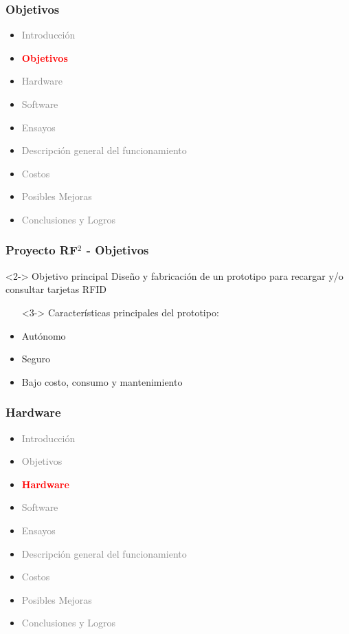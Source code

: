 \documentclass{beamer}
\begin{document}
\begin{frame}
	\frametitle{Objetivos}
	\begin{itemize}
		\item \textcolor{gray}{Introducción}
		\item \textcolor{red}{\bf{Objetivos}}
		\item \textcolor{gray}{Hardware}
		\item \textcolor{gray}{Software}
		\item \textcolor{gray}{Ensayos}
		\item \textcolor{gray}{Descripción general del funcionamiento}		
		\item \textcolor{gray}{Costos}
		\item \textcolor{gray}{Posibles Mejoras}
		\item \textcolor{gray}{Conclusiones y Logros}
	\end{itemize}
\end{frame}

\begin{frame}
	\frametitle{Proyecto RF$ ^{2} $ - Objetivos}
		\begin{block}  {Objetivo principal}		
			Diseño y fabricación de un prototipo para recargar y/o consultar tarjetas RFID
		\end{block}

		\bigskip		
		\begin{itemize}			
			\item[] <3-> Características principales del prototipo:

			\bigskip	
			\item <4-> Autónomo

			\bigskip
			\item <4-> Seguro

			\bigskip
			\item <4-> Bajo costo, consumo y mantenimiento
		\end{itemize}

\end{frame}

\begin{frame}
	\frametitle{Hardware}
	\begin{itemize}
		\item \textcolor{gray}{Introducción}
		\item \textcolor{gray}{Objetivos}
		\item \textcolor{red}{\bf{Hardware}}
		\item \textcolor{gray}{Software}
		\item \textcolor{gray}{Ensayos}
		\item \textcolor{gray}{Descripción general del funcionamiento}		
		\item \textcolor{gray}{Costos}
		\item \textcolor{gray}{Posibles Mejoras}
		\item \textcolor{gray}{Conclusiones y Logros}
	\end{itemize}
\end{frame}
\end{document}
